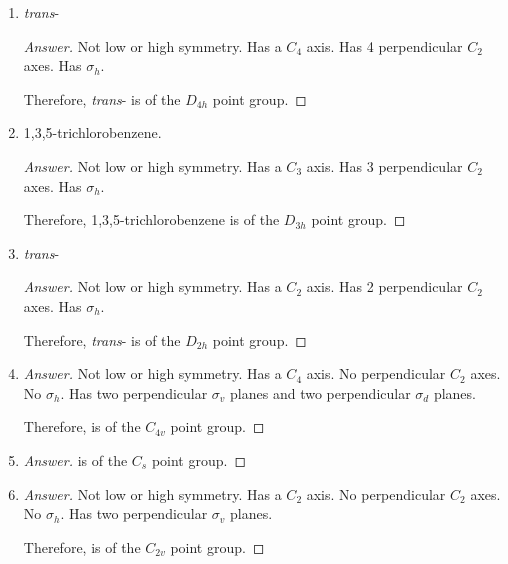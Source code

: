 \documentclass[../psets.tex]{subfiles}
\begin{document}
\begin{enumerate}[label={\Roman*)}]
\begin{enumerate}[label={\alph*)}]
\begin{proof}[Answer]
            Therefore, a tennis ball is of the $\boxed{D_{2d}}$ point group.
        \end{proof}
        \item \emph{trans}-\ce{[CrCl2(H2O)4]+}
        \begin{proof}[Answer]
            Not low or high symmetry. Has a $C_4$ axis. Has 4 perpendicular $C_2$ axes. Has $\sigma_h$.\par
            Therefore, \emph{trans}-\ce{[CrCl2(H2O)4]+} is of the $\boxed{D_{4h}}$ point group.
        \end{proof}
        \item 1,3,5-trichlorobenzene.
        \begin{proof}[Answer]
            Not low or high symmetry. Has a $C_3$ axis. Has 3 perpendicular $C_2$ axes. Has $\sigma_h$.\par
            Therefore, 1,3,5-trichlorobenzene is of the $\boxed{D_{3h}}$ point group.
        \end{proof}
        \item \emph{trans}-
        \begin{proof}[Answer]
            Not low or high symmetry. Has a $C_2$ axis. Has 2 perpendicular $C_2$ axes. Has $\sigma_h$.\par
            Therefore, \emph{trans}- is of the $\boxed{D_{2h}}$ point group.
        \end{proof}
        \item {}
        \begin{proof}[Answer]
            Not low or high symmetry. Has a $C_4$ axis. No perpendicular $C_2$ axes. No $\sigma_h$. Has two perpendicular $\sigma_v$ planes and two perpendicular $\sigma_d$ planes.\par
            Therefore,  is of the $\boxed{C_{4v}}$ point group.
        \end{proof}
        \item {}
        \begin{proof}[Answer]
             is of the $\boxed{C_s}$ point group.
        \end{proof}
        \item {}
        \begin{proof}[Answer]
            Not low or high symmetry. Has a $C_2$ axis. No perpendicular $C_2$ axes. No $\sigma_h$. Has two perpendicular $\sigma_v$ planes.\par
            Therefore,  is of the $\boxed{C_{2v}}$ point group.

\end{proof}
\end{enumerate}
\end{enumerate}
\end{document}
